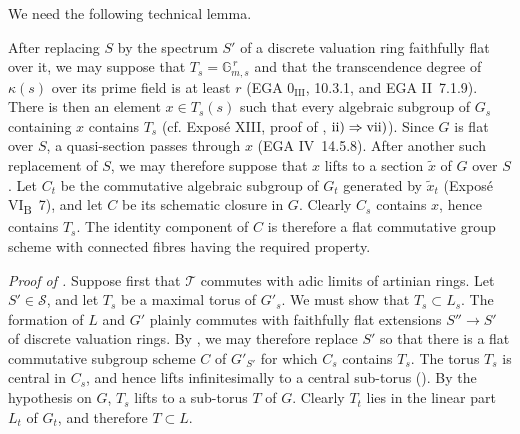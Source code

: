 We need the following technical lemma.


After replacing \(S\) by the spectrum \(S'\) of a discrete valuation
ring faithfully flat over it, we may suppose that
\(T_s=\mathbb G_{m,s}^{\,r}\) and that the transcendence degree of
\(\kappa(s)\) over its prime field is at least \(r\)
(EGA \(0_{\mathrm{III}}\), 10.3.1, and EGA II~7.1.9). There is then
an element \(x\in T_s(s)\) such that every algebraic subgroup of
\(G_s\) containing \(x\) contains \(T_s\)
(cf. Exposé XIII, proof of ,
\(\textup{ii)}\Rightarrow\textup{vii)}\)).
Since \(G\) is flat over \(S\), a quasi-section passes through \(x\)
(EGA IV~14.5.8). After another such replacement of \(S\), we may
therefore suppose that \(x\) lifts to a section
\(\widetilde x\) of \(G\) over \(S\). Let \(C_t\) be the commutative
algebraic subgroup of \(G_t\) generated by \(\widetilde x_t\)
(Exposé VI\textsubscript{B}~7), and let \(C\) be its schematic
closure in \(G\). Clearly \(C_s\) contains \(x\), hence contains
\(T_s\). The identity component of \(C\) is therefore a flat
commutative group scheme with connected fibres having the required
property.

\medskip\noindent\textit{Proof of .}
Suppose first that \(\mathcal T\) commutes with adic limits of
artinian rings. Let \(S'\in\mathcal S\), and let \(T_s\) be a maximal
torus of \(G'_s\). We must show that \(T_s\subset L_s\). The
formation of \(L\) and \(G'\) plainly commutes with faithfully flat
extensions \(S''\to S'\) of discrete valuation rings. By ,
we may therefore replace \(S'\) so that there is a flat commutative
subgroup scheme \(C\) of \(G'_{S'}\) for which \(C_s\) contains
\(T_s\). The torus \(T_s\) is central in \(C_s\), and hence lifts
infinitesimally to a central sub-torus (). By the
hypothesis on \(G\), \(T_s\) lifts to a sub-torus \(T\) of \(G\).
Clearly \(T_t\) lies in the linear part \(L_t\) of \(G_t\), and
therefore \(T\subset L\).

